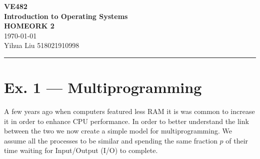 \documentclass[a4paper]{article}
\begin{document}
\begin{center}
    \huge
    \textbf{VE482\\Introduction to Operating Systems\\}
    \Large
    \vspace{15pt}
    \uppercase{\textbf{Homeork 2}}\\
    \large
    \vspace{5pt}\today\\
    \vspace{5pt}
    Yihua Liu 518021910998
    \vspace{5pt}
    \rule[-5pt]{.97\linewidth}{0.05em}
\end{center}
\section*{Ex. 1 — Multiprogramming}
A few years ago when computers featured less RAM it is was common to increase it in order to enhance CPU performance. In order to better understand the link between the two we now create a simple model for multiprogramming. We assume all the processes to be similar and spending the same fraction $p$ of their time waiting for Input/Output (I/O) to complete.
\end{document}
